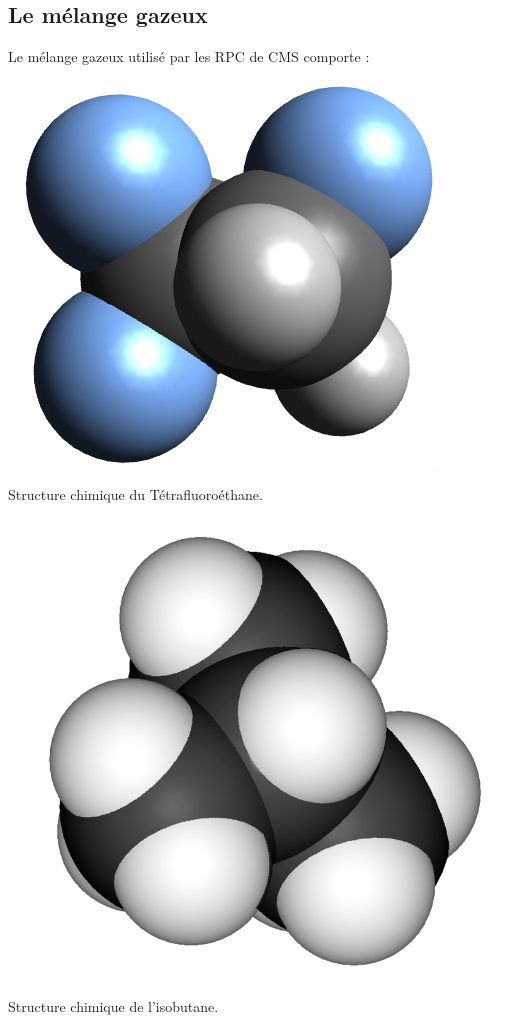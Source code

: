 \subsection{Le mélange gazeux}
Le mélange gazeux utilisé par les RPC de CMS comporte :
\marginpar
{
	\centering
	\includegraphics[width=\marginparwidth]{RPC/C2H2F4.png}
	\captionsetup{type=subfigure}\caption{Structure chimique du Tétrafluoroéthane.}
	\label{Tetra}
}
\marginpar
{
	\centering
	\includegraphics[width=\marginparwidth]{RPC/Isobutane.png}
	\captionsetup{type=subfigure}\caption{Structure chimique de l'isobutane.}
	\label{Iso}
}
